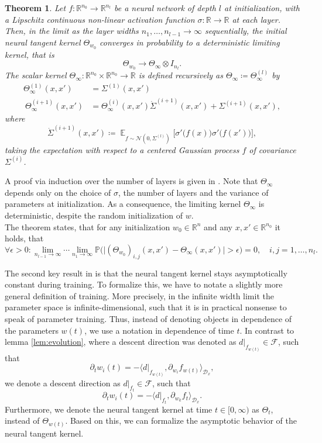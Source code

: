 \documentclass[11pt, a4paper]{article}
\newtheorem{theorem}{Theorem}[section]
\newcommand{\R}{\mathbb{R}}
\newcommand{\D}{\mathcal{D}}
\newcommand{\F}{\mathcal{F}}
\DeclareMathOperator*{\E}{\mathbb{E}}
\begin{document}
\begin{theorem}
Let $f: \R^{n_0} \to \R^{n_l}$ be a neural network of depth $l$ at initialization, with a Lipschitz continuous non-linear activation function $\sigma: \R \to \R$ at each layer. Then, in the limit as the layer widths $n_1, \dots, n_{l-1} \to \infty$ sequentially, the initial neural tangent kernel $\Theta_{w_0}$ converges in probability to a deterministic limiting kernel, that is
\[ \Theta_{w_0} \to \Theta_{\infty} \otimes I_{n_l}. \]
The scalar kernel $\Theta_{\infty} : \R^{n_0} \times \R^{n_0} \to \R$ is defined recursively as $\Theta_{\infty} \coloneq \Theta_{\infty}^{(l)}$ by
\[ \begin{split} 
\Theta_{\infty}^{(1)} (x,x') &= \Sigma^{(1)}(x,x') \\\
\Theta_{\infty}^{(i+1)}(x,x') &= \Theta_{\infty}^{(i)}(x,x') \dot{\Sigma}^{(i+1)}(x,x') + \Sigma^{(i+1)}(x,x'),
\end{split} \]
where 
\[ \dot{\Sigma}^{(i+1)}(x,x') \coloneq \E_{f \sim \mathcal{N}(0, \Sigma^{(l)})} \Big [ \sigma' \big ( f(x) \big ) \sigma' \big ( f(x') \big) \Big ], \]
taking the expectation with respect to a centered Gaussian process $f$ of covariance $\Sigma^{(i)}$.
\end{theorem}

A proof via induction over the number of layers is given in \cite{NTK}. Note that $\Theta_{\infty}$ depends only on the choice of $\sigma$, the number of layers and the variance of parameters at initialization. As a consequence, the limiting kernel $\Theta_{\infty}$ is deterministic, despite the random initialization of $w$. \\

The theorem states, that for any initialization $w_0 \in \R^n$ and any  $x,x' \in \R^{n_0}$ it holds, that
\[ \forall \epsilon > 0 : \lim_{n_{l-1} \to \infty} \cdots \lim_{n_1 \to \infty} \mathbb{P} \Big ( \big | (\Theta_{w_0})_{i,j}(x,x') - \Theta_{\infty}(x,x') \big | > \epsilon \Big ) = 0, \quad i,j=1, \dots, n_l. \]

The second key result in \cite{NTK} is that the neural tangent kernel stays asymptotically constant during training. To formalize this, we have to notate a slightly more general definition of training. More precisely, in the infinite width limit the parameter space is infinite-dimensional, such that it is in practical nonsense to speak of parameter training. Thus, instead of denoting objects in dependence of the parameters $w(t)$, we use a notation in dependence of time $t$. In contrast to lemma \ref{lem:evolution}, where a descent direction was denoted as $d|_{f_{w(t)}} \in \F$, such that 
\[ \partial_tw_i(t) = - \big \langle d|_{f_{w(t)}}, \partial_{w_i} f_{w(t)} \big \rangle_{\D_x}, \]
we denote a descent direction as $d|_{f_t} \in \F$, such that
\[ \partial_tw_i(t) = - \big \langle d|_{f_t}, \partial_{w_k} f_t \big \rangle_{\D_x}. \]
Furthermore, we denote the neural tangent kernel at time $t \in [0, \infty)$ as $\Theta_t$, instead of $\Theta_{w(t)}$. Based on this, we can formalize the asymptotic behavior of the neural tangent kernel.
\end{document}
